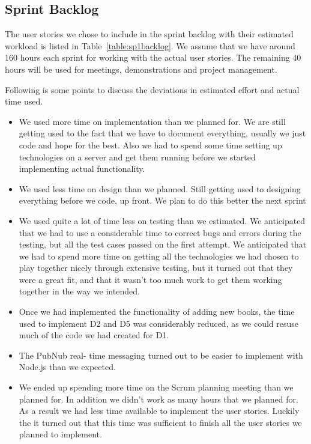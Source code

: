 \subsection{Sprint Backlog}
The user stories we chose to include in the sprint backlog with their estimated workload is listed in Table~\ref{table:sp1backlog}. We assume that we have around 160 hours each sprint for working with the actual user stories. The remaining 40 hours will be used for meetings, demonstrations and project management.

Following is some points to discuss the deviations in estimated effort and actual time used.
\begin{itemize}
\item We used more time on implementation than we planned for. We are still getting used to the fact that we have to document everything, usually we just code and hope for the best. Also we had to spend some time setting up technologies on a server and get them running before we started implementing actual functionality.
\item We used less time on design than we planned. Still getting used to designing everything before we code, up front. We plan to do this better the next sprint
\item We used quite a lot of time less on testing than we estimated. We anticipated that we had to use a considerable time to correct bugs and errors during the testing, but all the test cases passed on the first attempt. We anticipated that we had to spend more time on getting all the technologies we had chosen to play together nicely through extensive testing, but it turned out that they were a great fit, and that it wasn't too much work to get them working together in the way we intended.
\item Once we had implemented the functionality of adding new books, the time used to implement D2 and D5 was considerably reduced, as we could resuse much of the code we had created for D1.
\item The PubNub real- time messaging turned out to be easier to implement with Node.js than we expected. 
\item We ended up spending more time on the Scrum planning meeting than we planned for. In addition we didn't work as many hours that we planned for. As a result we had less time available to implement the user stories. Luckily the it turned out that this time was sufficient to finish all the user stories we planned to implement.
\end{itemize}

